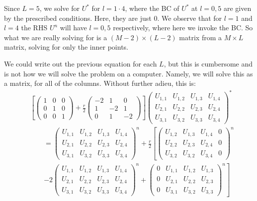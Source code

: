 \documentclass[11pt]{article}
\def\f{\frac }
\begin{document}
\begin{enumerate}
Since $L = 5$, we solve for $U^{*}$ for $l = 1\cdot 4$, where the BC of $U^{*}$ at $l = 0, 5$ are given by the prescribed conditions.
Here, they are just 0.
We observe that for $l=1$ and $l=4$ the RHS $U^{n}$ will have $l=0,5$ respectively, where here we invoke the BC.
So what we are really solving for is a $(M-2) \times (L-2)$ matrix from a $M\times L$ matrix, solving for only the inner points.

We could write out the previous equation for each $L$, but this is cumbersome and is not how we will solve the problem on a computer.
Namely, we will solve this as a matrix, for all of the columns.
Without further adieu, this is:
\begin{align*} & \left [ \left ( \begin{array}{ccc} 1 & 0 & 0\\ 0 & 1 & 0\\ 0 & 0 & 1 \end{array} \right )  + \f{r}{2} \left ( \begin{array}{ccc} -2 & 1 & 0\\ 1 & -2 & 1\\ 0 & 1 & -2 \end{array} \right )\right ] \left ( \begin{array}{cccc} U_{1,1} & U_{1,2} & U_{1,3} & U_{1,4 }\\ U_{2,1} & U_{2,2} & U_{2,3} & U_{2,4 } \\ U_{3,1} & U_{3,2} & U_{3,3} & U_{3,4 }  \end{array} \right ) ^{*} \\
& ~~~~~~~~~= \left ( \begin{array}{cccc} U_{1,1} & U_{1,2} & U_{1,3} & U_{1,4 }\\ U_{2,1} & U_{2,2} & U_{2,3} & U_{2,4 } \\ U_{3,1} & U_{3,2} & U_{3,3} & U_{3,4 }  \end{array} \right ) ^{n} + \f{r}{2} \left [ \left ( \begin{array}{cccc} U_{1,2} & U_{1,3} & U_{1,4} & 0 \\ U_{2,2} & U_{2,3} & U_{2,4} & 0 \\ U_{3,2} & U_{3,2} & U_{3,4} & 0  \end{array} \right ) ^{n} \right.\\
& ~~~~~~~~~\left. -2\left ( \begin{array}{cccc} U_{1,1} & U_{1,2} & U_{1,3} & U_{1,4 }\\ U_{2,1} & U_{2,2} & U_{2,3} & U_{2,4 } \\ U_{3,1} & U_{3,2} & U_{3,3} & U_{3,4 }  \end{array} \right ) ^{n} + \left ( \begin{array}{cccc} 0 & U_{1,1} & U_{1,2} & U_{1,3 }\\ 0 & U_{2,1} & U_{2,2} & U_{2,3 } \\ 0 & U_{3,1} & U_{3,2} & U_{3,3 }  \end{array} \right ) ^{n} \right ]\end{align*}


\end{enumerate}
\end{document}
